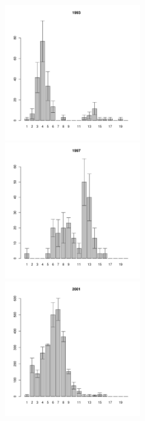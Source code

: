 \begin{figure}[h]
\begin{multicols}{3}
\hfill
\includegraphics[width=60mm]{../White_Sea/Estuatiy_Luvenga/sizestr_1993_.pdf}
\hfill
\includegraphics[width=60mm]{../White_Sea/Estuatiy_Luvenga/sizestr_1997_.pdf}
\hfill
\includegraphics[width=60mm]{../White_Sea/Estuatiy_Luvenga/sizestr_2001_.pdf}
\end{multicols}



\end{figure}
